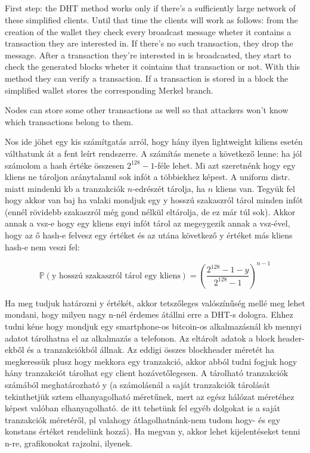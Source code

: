 \documentclass[a4paper,12pt]{article}
\begin{document}


\subsection{}
First step: the DHT method works only if there's a sufficiently large network of these simplified clients. Until that time the clients will work as follows: from the creation of the wallet they check every broadcast message wheter it contains a transaction they are interested in. If there's no such transaction, they drop the message. After a transaction they're interested in is broadcasted, they start to check the generated blocks wheter it cointains that transaction or not. With this method they can verify a transaction. If a transaction is stored in a block the simplified wallet stores the corresponding Merkel branch.

Nodes can store some other transactions as well so that attackers won't know which transactions belong to them.


Nos ide jöhet egy kis számítgatás arról, hogy hány ilyen lightweight kiliens esetén válthatunk át a fent leírt rendszerre. A számítás menete a következő lenne: ha jól számolom a hash értéke összesen $2^{128}-1$-féle lehet. Mi azt szeretnénk hogy egy kliens ne tároljon aránytalanul sok infót a többiekhez képest. A uniform distr. miatt mindenki kb a tranzakciók $n$-edrészét tárolja, ha $n$ kliens van. Tegyük fel hogy akkor van baj ha valaki mondjuk egy y hosszú szakaszról tárol minden infót (ennél rövidebb szakaszról még gond nélkül eltárolja, de ez már túl sok). Akkor annak a vsz-e hogy egy kliens enyi infót tárol az megeygezik annak a vsz-ével, hogy az ő hash-e felvesz egy értéket és az utána következő y értéket más kliens hash-e nem veszi fel:

$$\mathbb{P}(\text{y hosszú szakaszról tárol egy kliens})=\left(\frac{2^{128}-1-y}{2^{128}-1}\right)^{n-1}$$

Ha meg tudjuk határozni y értékét, akkor tetszőleges valószínűség mellé meg lehet mondani, hogy milyen nagy n-nél érdemes átállni erre a DHT-s dologra. Ehhez tudni kéne hogy mondjuk egy smartphone-os bitcoin-os alkalmazásnál kb mennyi adatot tárolhatna el az alkalmazás a telefonon. Az eltárolt adatok a block header-ekből és a tranzakciókból állnak. Az eddigi összes blockheader méretét ha megkeressük plusz hogy mekkora egy tranzakció, akkor abból tudni fogjuk hogy hány tranzakciót tárolhat egy client hozávetőlegesen. A tárolható tranzakciók számából meghatározható y (a számolásnál a saját tranzakciók tárolását tekinthetjük sztem elhanyagolható méretűnek, mert az egész hálózat méretéhez képest valóban elhanyagolható. de itt tehetünk fel egyéb dolgokat is a saját tranzakciók méretéről, pl valahogy átlagolhatnánk-nem tudom hogy- és egy konstans értéket rendelünk hozzá). Ha megvan y, akkor lehet kijelentéseket tenni n-re, grafikonokat rajzolni, ilyenek.
\end{document}

